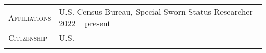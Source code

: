 \documentclass[11pt]{article}
\newcommand{\xspace}{23pt}
\begin{document}
\begin{tabularx}{\textwidth}{@{}Y Z@{}}
	\textsc{Affiliations}  & 
	U.S. Census Bureau, Special Sworn Status Researcher \hfill 2022 -- present%
	\\ \addlinespace[\xspace] 
	
	\textsc{Citizenship} & 
	U.S.
	\\ \addlinespace[\xspace] 
	

\end{tabularx}
\end{document}
